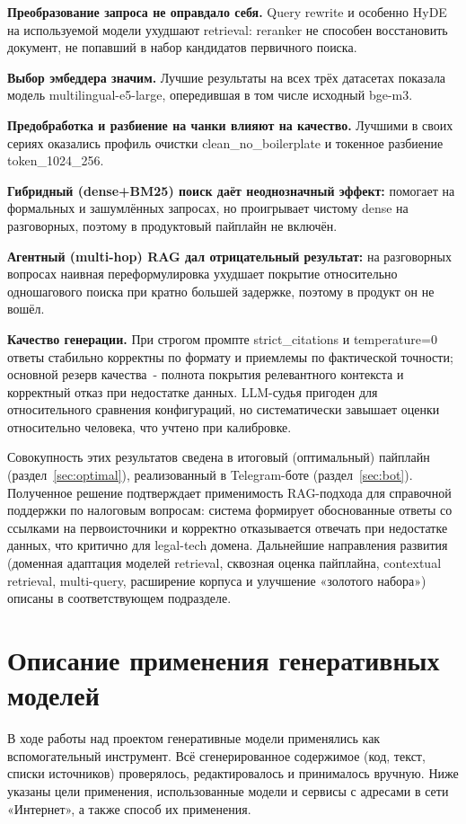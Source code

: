 \documentclass[a4paper,12pt]{article}
\begin{document}
\textbf{Преобразование запроса не оправдало себя.} Query rewrite и особенно HyDE на используемой модели ухудшают retrieval: reranker не способен восстановить документ, не попавший в набор кандидатов первичного поиска.

\textbf{Выбор эмбеддера значим.} Лучшие результаты на всех трёх датасетах показала модель multilingual-e5-large, опередившая в том числе исходный bge-m3.

\textbf{Предобработка и разбиение на чанки влияют на качество.} Лучшими в своих сериях оказались профиль очистки clean\_no\_boilerplate и токенное разбиение token\_1024\_256.

\textbf{Гибридный (dense+BM25) поиск даёт неоднозначный эффект:} помогает на формальных и зашумлённых запросах, но проигрывает чистому dense на разговорных, поэтому в продуктовый пайплайн не включён.

\textbf{Агентный (multi-hop) RAG дал отрицательный результат:} на разговорных вопросах наивная переформулировка ухудшает покрытие относительно одношагового поиска при кратно большей задержке, поэтому в продукт он не вошёл.

\textbf{Качество генерации.} При строгом промпте strict\_citations и temperature=0 ответы стабильно корректны по формату и приемлемы по фактической точности; основной резерв качества~- полнота покрытия релевантного контекста и корректный отказ при недостатке данных. LLM-судья пригоден для относительного сравнения конфигураций, но систематически завышает оценки относительно человека, что учтено при калибровке.

Совокупность этих результатов сведена в итоговый (оптимальный) пайплайн (раздел~\ref{sec:optimal}), реализованный в Telegram-боте (раздел~\ref{sec:bot}). Полученное решение подтверждает применимость RAG-подхода для справочной поддержки по налоговым вопросам: система формирует обоснованные ответы со ссылками на первоисточники и корректно отказывается отвечать при недостатке данных, что критично для legal-tech домена. Дальнейшие направления развития (доменная адаптация моделей retrieval, сквозная оценка пайплайна, contextual retrieval, multi-query, расширение корпуса и улучшение «золотого набора») описаны в соответствующем подразделе.

\newpage
\section{Описание применения генеративных моделей}

В ходе работы над проектом генеративные модели применялись как вспомогательный инструмент. Всё сгенерированное содержимое (код, текст, списки источников) проверялось, редактировалось и принималось вручную. Ниже указаны цели применения, использованные модели и сервисы с адресами в сети «Интернет», а также способ их применения.
\end{document}
